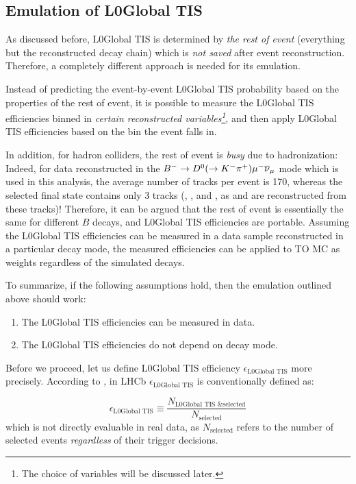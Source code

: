 \subsection{Emulation of L0Global TIS}

As discussed before, L0Global TIS is determined by \emph{the rest of event}
(everything but the reconstructed \B decay chain) which is \emph{not saved}
after event reconstruction.
Therefore, a completely different approach is needed for its emulation.

Instead of predicting the event-by-event L0Global TIS probability based on the
properties of the rest of event,
it is possible to measure the L0Global TIS efficiencies binned in
\emph{certain reconstructed variables\footnote{
    The choice of variables will be discussed later.
}},
and then apply L0Global TIS efficiencies based on the bin the event falls
in.

In addition, for hadron colliders,
the rest of event is \emph{busy} due to hadronization:
Indeed, for data reconstructed in the
${{{B}^-}} \rightarrow {\ensuremath{{D}^0}} (\rightarrow {\ensuremath{{K}^-}} {\ensuremath{{\pi}^+}}) {\mu^-} {{\overline{\nu}}_\mu}$ mode which is used in
this analysis,
the average number of tracks per event is 170,
whereas the selected \Dz\mun final state contains only 3 tracks (\Km, \pip, and
\mun, as \Dz and \Bm are reconstructed from these tracks)!
Therefore, it can be argued that the rest of event is essentially the same
for different $B$ decays,
and L0Global TIS efficiencies are portable.
%
Assuming the L0Global TIS efficiencies can be measured in a data
sample reconstructed in a particular decay mode, the measured efficiencies
can be applied to TO MC as weights regardless of the simulated decays.

To summarize, if the following assumptions hold, then the emulation outlined
above should work:

\begin{enumerate}
    \item The L0Global TIS efficiencies can be measured in data.
    \item The L0Global TIS efficiencies do not depend on \B decay mode.
\end{enumerate}

Before we proceed, let us define L0Global TIS efficiency
$\epsilon_\text{L0Global TIS}$ more precisely.
According to \cite{LHCb-PUB-2014-039}, in LHCb $\epsilon_\text{L0Global TIS}$
is conventionally defined as:

\begin{equation}
    \label{eqn:eff-l0global-tis}
    \epsilon_\text{L0Global TIS} \equiv
    \frac{N_\text{L0Global TIS \& selected}}{N_\text{selected}}
\end{equation}
which is not directly evaluable in real data, as $N_\text{selected}$ refers to
the number of selected events \emph{regardless} of their trigger decisions.

